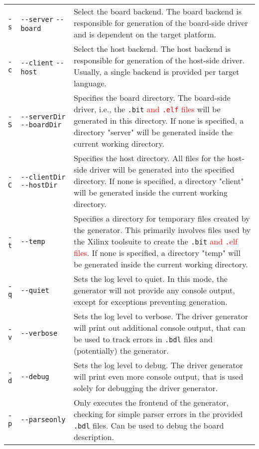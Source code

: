 \documentclass{report}
\begin{document}
\begin{table}
\centering
\begin{tabular}{ l p{2cm} | p{9cm} }
\hline
\verb!-s! & \verb!--server! \verb!--board! & Select the board backend. The board backend is responsible for generation of the board-side driver and is dependent on the target platform.\\
\verb!-c! & \verb!--client! \verb!--host! & Select the host backend. The host backend is responsible for generation of the host-side driver. Usually, a single backend is provided per target language.\\ \hline
\verb!-S! & \verb!--serverDir! \verb!--boardDir! & Specifies the board directory. The board-side driver, i.e., the \texttt{.bit} \textcolor{red}{and \texttt{.elf} files} will be generated in this directory. If none is specified, a directory "server" will be generated inside the current working directory.\\
\verb!-C! & \verb!--clientDir! \verb!--hostDir! & Specifies the host directory. All files for the host-side driver will be generated into the specified directory. If none is specified, a directory "client" will be generated inside the current working directory.\\
\verb!-t! & \verb!--temp!  & Specifies a directory for temporary files created by the generator. This primarily involves files used by the Xilinx toolsuite to create the \texttt{.bit} \textcolor{red}{and \texttt.elf files}. If none is specified, a directory "temp" will be generated inside the current working directory.\\ \hline
\verb!-q! & \verb!--quiet! & Sets the log level to quiet. In this mode, the generator will not provide any console output, except for exceptions preventing generation.\\
\verb!-v! & \verb!--verbose! & Sets the log level to verbose. The driver generator will print out additional console output, that can be used to track errors in \texttt{.bdl} files and (potentially) the generator.\\
\verb!-d! & \verb!--debug! & Sets the log level to debug. The driver generator will print even more console output, that is used solely for debugging the driver generator.\\ \hline
\verb!-p! & \verb!--parseonly! & Only executes the frontend of the generator, checking for simple parser errors in the provided \texttt{.bdl} files. Can be used to debug the board description.\\

\end{tabular}
\end{table}
\end{document}
